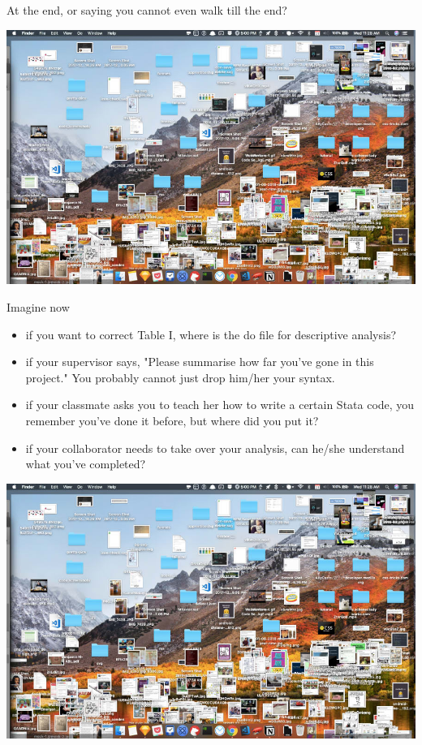 \begin{frame}{\secname}
At the end, or saying you cannot even walk till the end?

\begin{center}
		\includegraphics[scale=0.3]{image/more-messy-desktop}
\end{center}
\end{frame}

\begin{frame}{\secname}
Imagine now 
\begin{itemize}

	\item<1|handout:1-> if you want to correct Table I, where is the do file for descriptive analysis?
	\item<2|handout:2-> if your supervisor says, "Please summarise how far you've gone in this project." You probably cannot just drop him/her your syntax. 
	\item<3|handout:3-> if your classmate asks you to teach her how to write a certain Stata code, you remember you've done it before, but where did you put it?
	\item<4|handout:4> if your collaborator needs to take over your analysis, can he/she understand what you've completed?
\end{itemize}
\end{frame}

\begin{frame}{\secname}

\begin{center}
		\includegraphics[scale=0.3]{image/more-messy-desktop}
\end{center}
\end{frame}

